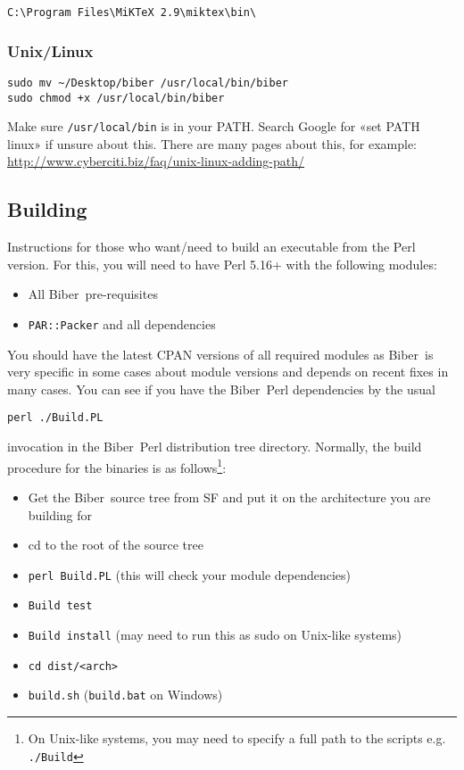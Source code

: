 \documentclass{ltxdockit}
\newcommand*{\biber}{Biber\xspace}
\begin{document}
\begin{verbatim}
C:\Program Files\MiKTeX 2.9\miktex\bin\
\end{verbatim}

\subsubsection{Unix/Linux}

\begin{verbatim}
sudo mv ~/Desktop/biber /usr/local/bin/biber
sudo chmod +x /usr/local/bin/biber
\end{verbatim}

\noindent Make sure \verb+/usr/local/bin+ is in your PATH. Search Google for «set PATH
linux» if unsure about this. There are many pages about this, for example:
\url{http://www.cyberciti.biz/faq/unix-linux-adding-path/}


\subsection{Building}

Instructions for those who want/need to build an executable from the
Perl version. For this, you will need to have Perl 5.16+ with
the following modules:

\begin{itemize}
\item All \biber\ pre-requisites
\item \verb+PAR::Packer+ and all dependencies
\end{itemize}

\noindent You should have the latest CPAN versions of all required modules
as \biber\ is very specific in some cases about module versions and
depends on recent fixes in many cases. You can see if you have the
\biber\ Perl dependencies by the usual

\begin{verbatim}
perl ./Build.PL
\end{verbatim}

\noindent invocation in the \biber\ Perl distribution tree
directory. Normally, the build procedure for the binaries is as
follows\footnote{On Unix-like systems, you may need to specify a full
  path to the scripts e.g. \texttt{./Build}}:

\begin{itemize}
\item Get the \biber\ source tree from SF and put it on the architecture
  you are building for
\item cd to the root of the source tree
\item \verb+perl Build.PL+ (this will check your module
  dependencies)
\item \verb+Build test+
\item \verb+Build install+ (may need to run this as sudo on
  Unix-like systems)
\item \verb+cd dist/<arch>+
\item \verb+build.sh+ (\verb+build.bat+ on Windows)
\end{itemize}
\end{document}
